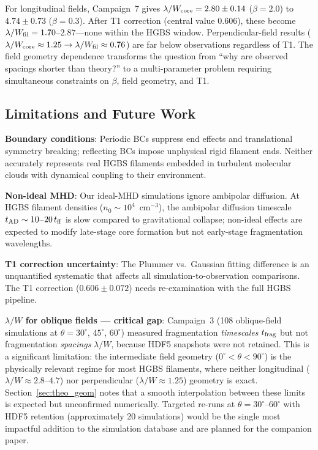 \documentclass[twoside,twocolumn]{mnras}
\begin{document}
For longitudinal fields, Campaign~7 gives $\lambda/W_{\rm core} = 2.80 \pm 0.14$
($\beta = 2.0$) to $4.74 \pm 0.73$ ($\beta = 0.3$). After T1 correction (central
value 0.606), these become $\lambda/W_{\rm fil} = 1.70$--$2.87$---none within the
HGBS window. Perpendicular-field results ($\lambda/W_{\rm core} \approx 1.25 \to
\lambda/W_{\rm fil} \approx 0.76$) are far below observations regardless of T1.
The field geometry dependence transforms the question from ``why are observed spacings
shorter than theory?'' to a multi-parameter problem requiring simultaneous constraints
on $\beta$, field geometry, and T1.

\subsection{Limitations and Future Work}

\textbf{Boundary conditions}: Periodic BCs suppress end effects and translational
symmetry breaking; reflecting BCs impose unphysical rigid filament ends. Neither
accurately represents real HGBS filaments embedded in turbulent molecular clouds with
dynamical coupling to their environment.

\textbf{Non-ideal MHD}: Our ideal-MHD simulations ignore ambipolar diffusion. At HGBS
filament densities ($n_0 \sim 10^4$~cm$^{-3}$), the ambipolar diffusion timescale
$t_{\rm AD} \sim 10$--$20\,t_{\rm ff}$ is slow compared to gravitational collapse;
non-ideal effects are expected to modify late-stage core formation but not early-stage
fragmentation wavelengths.

\textbf{T1 correction uncertainty}: The Plummer vs.\ Gaussian fitting difference is an
unquantified systematic that affects all simulation-to-observation comparisons. The
T1 correction ($0.606 \pm 0.072$) needs re-examination with the full HGBS pipeline.

\textbf{$\lambda/W$ for oblique fields --- critical gap}: Campaign~3 (108 oblique-field
simulations at $\theta = 30^\circ$, $45^\circ$, $60^\circ$) measured fragmentation
\textit{timescales} $t_{\rm frag}$ but not fragmentation \textit{spacings} $\lambda/W$,
because HDF5 snapshots were not retained. This is a significant limitation: the
intermediate field geometry ($0^\circ < \theta < 90^\circ$) is the physically relevant
regime for most HGBS filaments, where neither longitudinal ($\lambda/W \approx 2.8$--$4.7$)
nor perpendicular ($\lambda/W \approx 1.25$) geometry is exact. Section~\ref{sec:theo_geom}
notes that a smooth interpolation between these limits is expected but unconfirmed
numerically. Targeted re-runs at $\theta = 30^\circ$--$60^\circ$ with HDF5 retention
(approximately 20 simulations) would be the single most impactful addition to the
simulation database and are planned for the companion paper.
\end{document}
